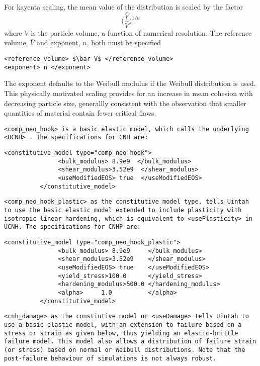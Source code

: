 \begin{enumerate}
For kayenta scaling, the mean value of the distribution is scaled by the factor
\begin{equation}
\biggl(\frac{\bar V}{V}\biggr)^{1/n}
\end{equation}
where $V$ is the particle volume, a function of numerical resolution.  The reference volume, 
$\bar V$ and exponent, $n$, both must be specified
\begin{Verbatim}[fontsize=\footnotesize]
<reference_volume> $\bar V$ </reference_volume>
<exponent> n </exponent>
\end{Verbatim}
The exponent defaults to the Weibull modulus if the Weibull distribution is used.  This physically
motivated scaling provides for an increase in mean cohesion with decreasing particle size, generallly
consistent with the observation that smaller quantities of material contain fewer critical flaws.

\tt <comp\_neo\_hook> \normalfont is a basic elastic model, which calls the underlying \tt <UCNH> \normalfont .
The specifications for CNH are:

\begin{Verbatim}[fontsize=\footnotesize]
          <constitutive_model type="comp_neo_hook">
               <bulk_modulus> 8.9e9  </bulk_modulus>
               <shear_modulus>3.52e9  </shear_modulus>
               <useModifiedEOS> true  </useModifiedEOS>
          </constitutive_model>
\end{Verbatim}

\tt <comp\_neo\_hook\_plastic> \normalfont as the constitutive model type,
 tells Uintah to use the basic elastic model extended
to include plasticity with isotropic linear hardening, 
which is equivalent to \tt <usePlasticity> \normalfont in UCNH.
The specifications for CNHP are:

\begin{Verbatim}[fontsize=\footnotesize]
          <constitutive_model type="comp_neo_hook_plastic">
               <bulk_modulus> 8.9e9     </bulk_modulus>
               <shear_modulus>3.52e9    </shear_modulus>
               <useModifiedEOS> true    </useModifiedEOS>
               <yield_stress>100.0      </yield_stress>
               <hardening_modulus>500.0 </hardening_modulus>
               <alpha>     1.0          </alpha>
          </constitutive_model>
\end{Verbatim}


\tt <cnh\_damage> \normalfont as the constiutive model or \tt <useDamage> \normalfont 
tells Uintah to use a basic elastic model, with an extension
to failure based on a stress or strain as given below, thus yielding an
elastic-brittle failure model.  This model also allows a distribution
of failure strain (or stress) based on normal or Weibull distributions.
Note that the post-failure behaviour of simulations is not always robust.


\end{enumerate}

